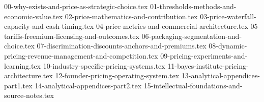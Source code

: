 
{00-why-exists-and-price-as-strategic-choice.tex}
{01-thresholds-methods-and-economic-value.tex}
{02-price-mathematics-and-contribution.tex}
{03-price-waterfall-capacity-and-cash-timing.tex}
{04-price-metrics-and-commercial-architecture.tex}
{05-tariffs-freemium-licensing-and-outcomes.tex}
{06-packaging-segmentation-and-choice.tex}
{07-discrimination-discounts-anchors-and-premiums.tex}
{08-dynamic-pricing-revenue-management-and-competition.tex}
{09-pricing-experiments-and-learning.tex}
{10-industry-specific-pricing-systems.tex}
{11-bayes-institute-pricing-architecture.tex}
{12-founder-pricing-operating-system.tex}
{13-analytical-appendices-part1.tex}
{14-analytical-appendices-part2.tex}
{15-intellectual-foundations-and-source-notes.tex}
